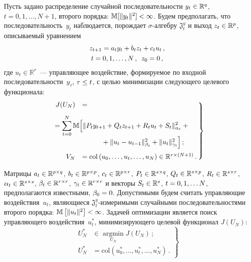 \begin{multicols}{2}
 Пусть задано распределение случайной последовательности
$y_t\hm\in \mathbb{R}^q$, $t=0, 1, \ldots , N+1$, второго порядка:
$\mathbb{M}[\|y_t\|^2]\hm<\infty$. Будем предполагать, что
последовательность~$y_t$ наблюдается, порождает\linebreak
 $\sigma$-ал\-геб\-ру $\mathfrak{J}_t^y$ и выход $z_t\hm\in
\mathbb{R}^p$, описываемый уравнением
 \begin{multline}
 z_{t+1}= a_t y_t +b_t z_t +c_t u_t\,,\\
 t=0,1,\ldots , N\,,\enskip z_0=0\,,
 \label{e1-bos}
 \end{multline}
где $u_t\in \mathbb{R}^r$~--- управ\-ля\-ющее воздействие, формируемое по
входной последовательности~$y_\tau$, $\tau\hm\leq t$, с целью минимизации
следующего целевого функционала:
\begin{equation}
\left.
\begin{array}{rl}
J(U_N)& =\\[9pt]
&\hspace*{-15mm}{}=\displaystyle
\sum\limits_{t=0}^N \mathbb{M}
\Big[
 \| P_t y_{t+1} +Q_t z_{t+1}
 +R_t u_t +S_t\|^2_{\alpha_t} +{} \\
&\hspace*{10mm} {}+\| u_t-u_{t-1}\|^2_{\beta_t}+
\| u_t\|^2_{\gamma_t}\Big]\,;\\[9pt]
V_N &=\mathrm{col} \left( u_0,\ldots , u_t, \ldots , u_N\right)
\in \mathbb{R}^{r\times (N+1)}\,.
\end{array}\!\!
\right\}\!
\label{e2-bos}
\end{equation}

 Матрицы $a_t\hm\in \mathbb{R}^{p\times q}$,
$b_t\hm\in \mathbb{R}^{p\times p}$, $c_t\hm\in \mathbb{R}^{p\times r}$,
$P_t\hm\in \mathbb{R}^{s\times q}$, $Q_t\hm\in \mathbb{R}^{s\times p}$,
$R_t\hm\in \mathbb{R}^{s\times r}$, $\alpha_t\hm\in \mathbb{R}^{s\times s}$,
$\beta_t\hm\in \mathbb{R}^{r\times r}$, $\gamma_t\hm\in \mathbb{R}^{r\times r}$
и векторы
$S_t\hm\in \mathbb{R}^s$, $t\hm=0,1,\ldots N$, предполагаются известными,
$\beta_0\hm=0$. Допустимыми будем считать управляющие воздействия~$u_t$,
являющиеся $\mathfrak{J}_t^y$-из\-ме\-ри\-мы\-ми случайными
последовательностями второго порядка:
$\mathbb{M}\left[ \|u_t\|^2\right]\hm<\infty$. Задачей оптимизации
является поиск управ\-ля\-юще\-го
воздействия~$u_t^*$, минимизирующего целевой функционал $J(U_N)$:
 \begin{equation}
 \left.
 \begin{array}{rl}
 U_N^*&\in \mathop{\mbox{argmin}}\limits_{U_N} J(U_N)\,;\\[9pt]
 U_N^* &=\mathrm{col} \left( u_0^*, \ldots , u_t^*,\ldots , u_N^*\right)\,.
 \end{array}
 \right\}
 \label{e3-bos}
 \end{equation}


\end{multicols}
